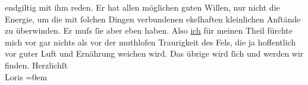 \begin{ledgroupsized}[t]{13cm}
               endgiltig mit ihm reden. Er hat allen möglichen guten Willen, nur nicht die Energie,
               um die mit ſolchen Dingen verbundenen ekelhaften kleinlichen Anſtände zu überwinden.
               Er muſs ſie aber eben haben. Also \uline{ich} für meinen
               Theil fürchte mich vor gar nichts als vor der muthloſen {\pb}Traurigkeit des Fels, die ja hoffentlich vor guter Luft und Ernährung weichen
               wird. Das übrige wird ſich und werden wir finden.\pend
           \pstart
           Herzlichſt{\\[\baselineskip]}\spacefill\mbox{Loris}\pend
           \leftskip=0em{}
         
         \endnumbering{}\end{ledgroupsized}  \newcommand{\dateiname}{L00179}\newcommand{\titel}{Hugo von Hofmannsthal an Arthur Schnitzler, [18. 2. 1893]}\newcommand{\editorInnen}{ Martin Anton Müller und Gerd-Hermann Susen}
      